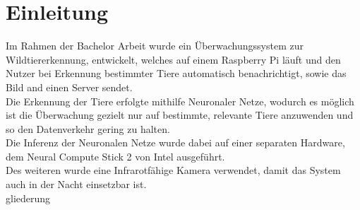 \chapter{Einleitung}\label{kap:einleitung}

Im Rahmen der Bachelor Arbeit wurde ein Überwachungssystem zur Wildtiererkennung,
entwickelt, welches auf einem Raspberry Pi läuft und den Nutzer bei Erkennung
bestimmter Tiere automatisch benachrichtigt, sowie das Bild and einen Server sendet.
\\
Die Erkennung der Tiere erfolgte mithilfe Neuronaler Netze, wodurch es möglich ist 
die Überwachung gezielt nur auf bestimmte, relevante Tiere anzuwenden und so den
Datenverkehr gering zu halten. 
\\
Die Inferenz der Neuronalen Netze wurde dabei auf einer separaten Hardware, dem 
Neural Compute Stick 2 von Intel ausgeführt.
\\
Des weiteren wurde eine Infrarotfähige Kamera verwendet, damit das System auch
in der Nacht einsetzbar ist.
\\
gliederung